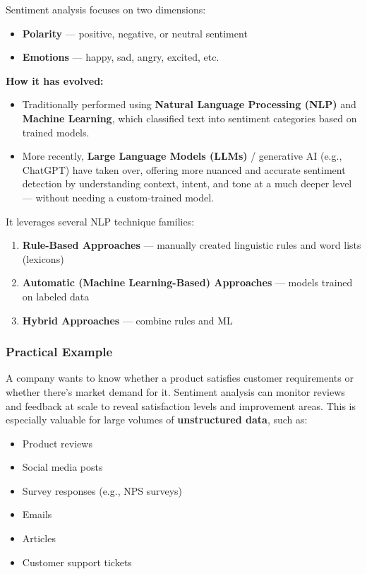 \documentclass[12pt,openany]{book}
\begin{document}
Sentiment analysis focuses on two dimensions:
\begin{itemize}[leftmargin=*]
    \item \textbf{Polarity} --- positive, negative, or neutral sentiment
    \item \textbf{Emotions} --- happy, sad, angry, excited, etc.
\end{itemize}

\textbf{How it has evolved:}
\begin{itemize}[leftmargin=*]
    \item Traditionally performed using \textbf{Natural Language Processing (NLP)} and \textbf{Machine Learning}, which classified text into sentiment categories based on trained models.
    \item More recently, \textbf{Large Language Models (LLMs)} / generative AI (e.g., ChatGPT) have taken over, offering more nuanced and accurate sentiment detection by understanding context, intent, and tone at a much deeper level --- without needing a custom-trained model.
\end{itemize}

It leverages several NLP technique families:
\begin{enumerate}[leftmargin=*]
    \item \textbf{Rule-Based Approaches} --- manually created linguistic rules and word lists (lexicons)
    \item \textbf{Automatic (Machine Learning-Based) Approaches} --- models trained on labeled data
    \item \textbf{Hybrid Approaches} --- combine rules and ML
\end{enumerate}

\subsubsection{Practical Example}

A company wants to know whether a product satisfies customer requirements or whether there's market demand for it. Sentiment analysis can monitor reviews and feedback at scale to reveal satisfaction levels and improvement areas. This is especially valuable for large volumes of \textbf{unstructured data}, such as:
\begin{itemize}[leftmargin=*]
    \item Product reviews
    \item Social media posts
    \item Survey responses (e.g., NPS surveys)
    \item Emails
    \item Articles
    \item Customer support tickets
\end{itemize}
\end{document}
